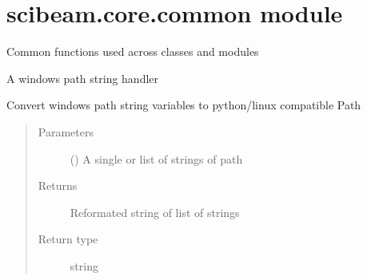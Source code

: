 \documentclass[letterpaper,10pt,english]{sphinxmanual}
\begin{document}
\section{scibeam.core.common module}
\label{\detokenize{scibeam.core:module-scibeam.core.common}}\label{\detokenize{scibeam.core:scibeam-core-common-module}}
Common functions used across classes and modules

\begin{fulllineitems}
\label{\detokenize{scibeam.core:scibeam.core.common.winPathHandler}}
A windows path string handler

Convert windows path string variables to python/linux compatible Path
\begin{quote}\begin{description}
\item[{Parameters}] \leavevmode
{} () \textendash{} A single or list of strings of path

\item[{Returns}] \leavevmode
Reformated string of list of strings

\item[{Return type}] \leavevmode
string

\end{description}\end{quote}

\end{fulllineitems}

\end{document}
